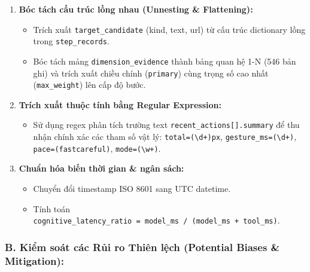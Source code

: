 \documentclass[11pt]{article}
\providecommand{\tightlist}{%
      \setlength{\itemsep}{0pt}\setlength{\parskip}{0pt}}
\begin{document}
\begin{enumerate}
\def\labelenumi{\arabic{enumi}.}
\tightlist
\item
  \textbf{Bóc tách cấu trúc lồng nhau (Unnesting \& Flattening):}

  \begin{itemize}
  \tightlist
  \item
    Trích xuất \texttt{target\_candidate} (kind, text, url) từ cấu trúc
    dictionary lồng trong \texttt{step\_records}.
  \item
    Bóc tách mảng \texttt{dimension\_evidence} thành bảng quan hệ 1-N
    (546 bản ghi) và trích xuất chiều chính (\texttt{primary}) cùng
    trọng số cao nhất (\texttt{max\_weight}) lên cấp độ bước.
  \end{itemize}
\item
  \textbf{Trích xuất thuộc tính bằng Regular Expression:}

  \begin{itemize}
  \tightlist
  \item
    Sử dụng regex phân tích trường text
    \texttt{recent\_actions{[}{]}.summary} để thu nhận chính xác các
    tham số vật lý: \texttt{total=(\textbackslash{}d+)px},
    \texttt{gesture\_ms=(\textbackslash{}d+)},
    \texttt{pace=(fast\textbar{}careful)},
    \texttt{mode=(\textbackslash{}w+)}.
  \end{itemize}
\item
  \textbf{Chuẩn hóa biến thời gian \& ngân sách:}

  \begin{itemize}
  \tightlist
  \item
    Chuyển đổi timestamp ISO 8601 sang UTC datetime.
  \item
    Tính toán
    \texttt{cognitive\_latency\_ratio\ =\ model\_ms\ /\ (model\_ms\ +\ tool\_ms)}.
  \end{itemize}
\end{enumerate}

\subsubsection{B. Kiểm soát các Rủi ro Thiên lệch (Potential Biases \&
Mitigation):}\label{b.-kiux1ec3m-souxe1t-cuxe1c-rux1ee7i-ro-thiuxean-lux1ec7ch-potential-biases-mitigation}
\end{document}
